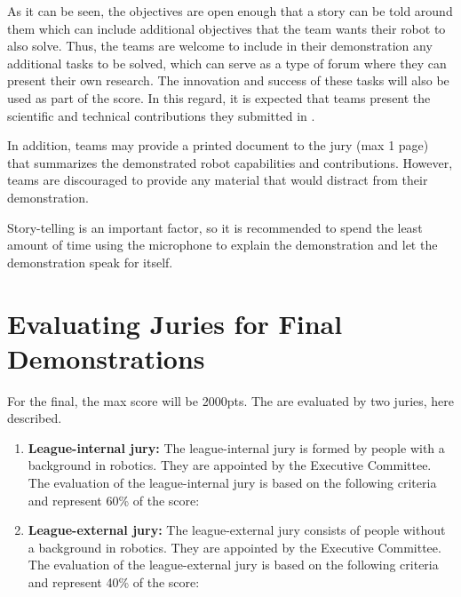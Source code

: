 As it can be seen, the objectives are open enough that a story can be told around them which can include additional objectives that the team wants their robot to also solve. Thus, the teams are welcome to include in their demonstration any additional tasks to be solved, which can serve as a type of forum where they can present their own research. The innovation and success of these tasks will also be used as part of the score. In this regard, it is expected that teams present the scientific and technical contributions they submitted in .

In addition, teams may provide a printed document to the jury (max 1 page) that summarizes the demonstrated robot capabilities and contributions. However, teams are discouraged to provide any material that would distract from their demonstration.

Story-telling is an important factor, so it is recommended to spend the least amount of time using the microphone to explain the demonstration and let the demonstration speak for itself.


\section{Evaluating Juries for Final Demonstrations}
For the final, the max score will be 2000pts.
The  are evaluated by two juries, here described.

\begin{enumerate}
\item\textbf{League-internal jury:} The league-internal jury is formed by people with a background in robotics. They are appointed by the Executive Committee. The evaluation of the league-internal jury is based on the following criteria and represent 60\% of the score:

\item \textbf{League-external jury:} The league-external jury consists of people without a background in robotics. They are appointed by the Executive Committee. The evaluation of the league-external jury is based on the following criteria and represent 40\% of the score:
\end{enumerate}

